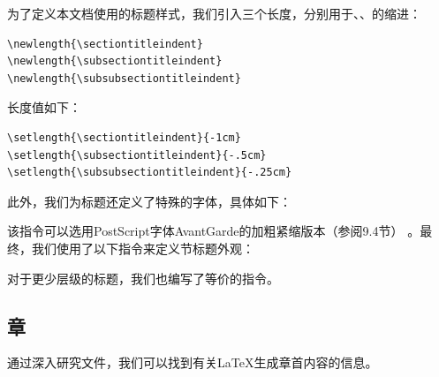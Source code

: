 为了定义本文档使用的标题样式，我们引入三个长度，分别用于、、的缩进：

\begin{dmd}
\begin{verbatim}
\newlength{\sectiontitleindent}
\newlength{\subsectiontitleindent}
\newlength{\subsubsectiontitleindent}\end{verbatim}
\end{dmd}

长度值如下：

\begin{dmd}
\begin{verbatim}
\setlength{\sectiontitleindent}{-1cm}
\setlength{\subsectiontitleindent}{-.5cm}
\setlength{\subsubsectiontitleindent}{-.25cm}\end{verbatim}
\end{dmd}

此外，我们为标题还定义了特殊的字体，具体如下：


该指令可以选用PostScript字体AvantGarde的加粗紧缩版本（参阅9.4节）%
。最终，我们使用了以下指令来定义节标题外观：


对于更少层级的标题，我们也编写了等价的指令。

\subsection{章}

通过深入研究文件，我们可以找到有关\LaTeX 生成章首内容的信息。

